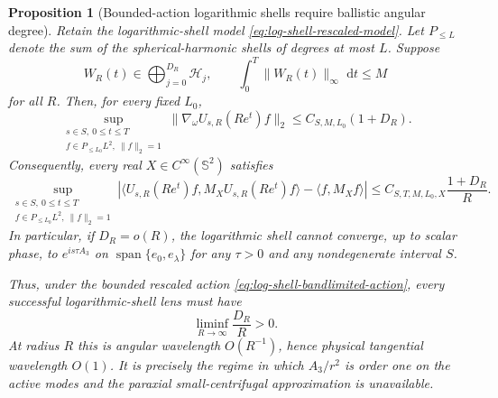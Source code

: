 \documentclass[11pt]{article}
\newtheorem{proposition}[theorem]{Proposition}
\theoremstyle{remark}
\newcommand{\dd}{\,\mathrm d}
\begin{document}
\begin{proposition}[Bounded-action logarithmic shells require ballistic
angular degree]
\label{prop:log-shell-ballistic-degree}
Retain the logarithmic-shell model
\eqref{eq:log-shell-rescaled-model}.  Let $P_{\leq L}$ denote the sum of the
spherical-harmonic shells of degrees at most $L$.  Suppose
\begin{equation}
 W_R(t)\in\bigoplus_{j=0}^{D_R}\mathcal H_j,
 \qquad
 \int_0^T\|W_R(t)\|_\infty\,\dd t\leq M
 \label{eq:log-shell-bandlimited-action}
\end{equation}
for all $R$.  Then, for every fixed $L_0$,
\begin{equation}
 \sup_{\substack{s\in S,\ 0\leq t\leq T\\
                  f\in P_{\leq L_0}L^2,\ \|f\|_2=1}}
 \|\nabla_\omega U_{s,R}(Re^t)f\|_2
 \leq
 C_{S,M,L_0}(1+D_R).
 \label{eq:log-shell-gradient-bandwidth-bound}
\end{equation}
Consequently, every real $X\in C^\infty(\mathbb S^2)$ satisfies
\begin{equation}
 \sup_{\substack{s\in S,\ 0\leq t\leq T\\
                  f\in P_{\leq L_0}L^2,\ \|f\|_2=1}}
 \left|
 \langle U_{s,R}(Re^t)f,M_XU_{s,R}(Re^t)f\rangle
 -
 \langle f,M_Xf\rangle
 \right|
 \leq
 C_{S,T,M,L_0,X}\frac{1+D_R}{R}.
 \label{eq:log-shell-bandwidth-density-bound}
\end{equation}
In particular, if $D_R=o(R)$, the logarithmic shell cannot converge, up to
scalar phase, to $e^{is\tau A_3}$ on
$\operatorname{span}\{e_0,e_\lambda\}$ for any $\tau>0$ and any
nondegenerate interval $S$.

Thus, under the bounded rescaled action
\eqref{eq:log-shell-bandlimited-action}, every successful logarithmic-shell
lens must have
\begin{equation}
 \liminf_{R\to\infty}\frac{D_R}{R}>0.
 \label{eq:log-shell-ballistic-degree-necessity}
\end{equation}
At radius $R$ this is angular wavelength $O(R^{-1})$, hence physical
tangential wavelength $O(1)$.  It is precisely the regime in which
$A_3/r^2$ is order one on the active modes and the paraxial
small-centrifugal approximation is unavailable.
\end{proposition}
\end{document}
